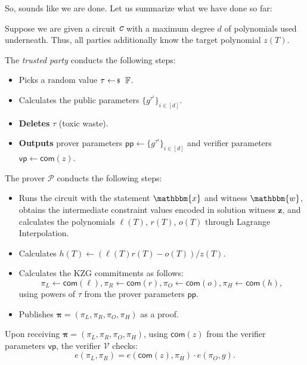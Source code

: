 \documentclass[../../book.tex]{subfiles}
\begin{document}
So, sounds like we are done. Let us summarize what we have done so far:
\begin{tcolorbox}[title=Attempt \#1: Non-sound SNARK Protocol,
    breakable,
    colback=blue!5!white,
    colframe=blue!75!black,
    colbacktitle=blue!25!white,
    coltitle=blue!20!black,
    fonttitle=\bfseries,
    boxrule=1.25pt,
    subtitle style={boxrule=0pt,
    colback=blue!20!white,
    colupper=blue!75!gray} ]

    Suppose we are given a circuit $\textit{\texttt{C}}$ with a maximum degree $d$ of polynomials used underneath. Thus, all parties additionally know the target polynomial $z(T)$.

    The \emph{trusted party} conducts the following steps:
    \begin{itemize}[label=]
        \item Picks a random value $\tau \leftarrowS \mathbb{F}$.
        \item Calculates the public parameters $\{g^{\tau^i}\}_{i \in [d]}$.
        \item \textbf{Deletes} $\tau$ (toxic waste).
        \item \textbf{Outputs} prover parameters $\mathsf{pp} \gets \{g^{\tau^i}\}_{i \in [d]}$ and verifier parameters $\mathsf{vp} \gets \mathsf{com}(z)$.
    \end{itemize}
    The prover $\mathcal{P}$ conducts the following steps:
    \begin{itemize}[label=]
        \item Runs the circuit with the statement $\mathbbm{x}$ and witness
        $\mathbbm{w}$, obtains the intermediate constraint values encoded in
        solution witness $\mathbf{z}$, and calculates the polynomials $\ell(T)$,
        $r(T)$, $o(T)$ through Lagrange Interpolation.
        \item Calculates $h(T) \gets (\ell(T)r(T) - o(T))\big/ z(T)$.
        \item Calculates the KZG commitments as follows: 
        \begin{equation*}
            \pi_L \gets \mathsf{com}(\ell), \pi_R \gets \mathsf{com}(r), \pi_O \gets \mathsf{com}(o), \pi_H \gets \mathsf{com}(h),
        \end{equation*}
        using powers of $\tau$ from the prover parameters $\mathsf{pp}$.
        \item Publishes $\boldsymbol{\pi} = (\pi_L,\pi_R,\pi_O,\pi_H)$ as a proof.
    \end{itemize}
    Upon receiving $\boldsymbol{\pi} = (\pi_L,\pi_R,\pi_O,\pi_H)$, using $\mathsf{com}(z)$ from the verifier parameters $\mathsf{vp}$, the verifier $\mathcal{V}$ checks:
    \begin{equation*}
        e(\pi_L, \pi_R) = e(\mathsf{com}(z), \pi_H) \cdot e(\pi_O, g).
    \end{equation*}
\end{tcolorbox}
\end{document}
